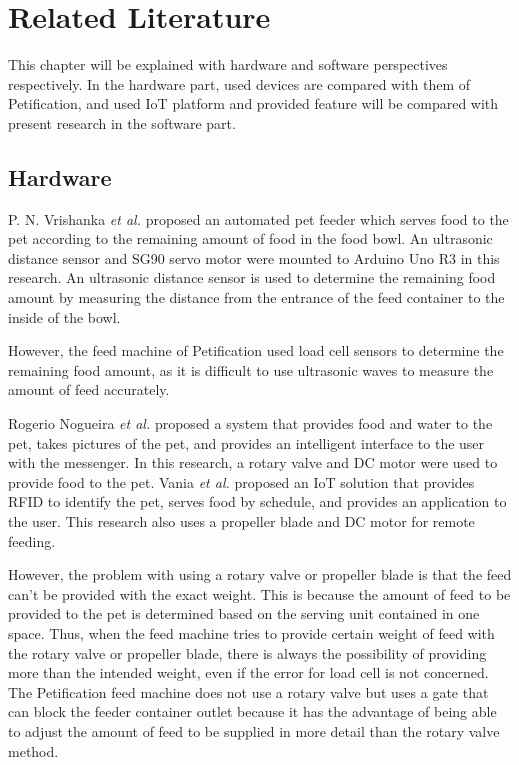 \documentclass[conference]{IEEEtran}
\begin{document}
\section{Related Literature}
This chapter will be explained with hardware and software perspectives respectively. In the hardware part, used devices are compared with them of Petification, and used IoT platform and provided feature will be compared with present research in the software part.

\subsection{Hardware}
P. N. Vrishanka \textit{et al.} \cite{b10} proposed an automated pet feeder which serves food to the pet according to the remaining amount of food in the food bowl. An ultrasonic distance sensor and SG90 servo motor were mounted to Arduino Uno R3 in this research. An ultrasonic distance sensor is used to determine the remaining food amount by measuring the distance from the entrance of the feed container to the inside of the bowl.

However, the feed machine of Petification used load cell sensors to determine the remaining food amount, as it is difficult to use ultrasonic waves to measure the amount of feed accurately.

Rogerio Nogueira \textit{et al.} \cite{b11} proposed a system that provides food and water to the pet, takes pictures of the pet, and provides an intelligent interface to the user with the messenger. In this research, a rotary valve and DC motor were used to provide food to the pet. Vania \textit{et al.} \cite{b12} proposed an IoT solution that provides RFID to identify the pet, serves food by schedule, and provides an application to the user. This research also uses a propeller blade and DC motor for remote feeding.

However, the problem with using a rotary valve or propeller blade is that the feed can’t be provided with the exact weight. This is because the amount of feed to be provided to the pet is determined based on the serving unit contained in one space. Thus, when the feed machine tries to provide certain weight of feed with the rotary valve or propeller blade, there is always the possibility of providing more than the intended weight, even if the error for load cell is not concerned. The Petification feed machine does not use a rotary valve but uses a gate that can block the feeder container outlet because it has the advantage of being able to adjust the amount of feed to be supplied in more detail than the rotary valve method.
\end{document}
